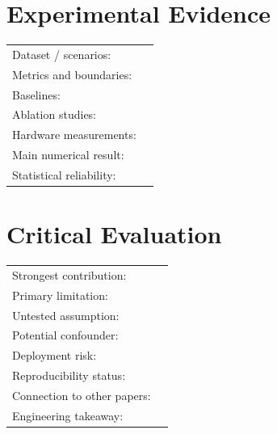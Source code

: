 \section*{Experimental Evidence}

\begin{tabularx}{\textwidth}{@{}p{4.0cm}X@{}}
Dataset / scenarios: & \\
Metrics and boundaries: & \\
Baselines: & \\
Ablation studies: & \\
Hardware measurements: & \\
Main numerical result: & \\
Statistical reliability: & \\
\end{tabularx}

\section*{Critical Evaluation}

\begin{tabularx}{\textwidth}{@{}p{4.0cm}X@{}}
Strongest contribution: & \\
Primary limitation: & \\
Untested assumption: & \\
Potential confounder: & \\
Deployment risk: & \\
Reproducibility status: & \\
Connection to other papers: & \\
Engineering takeaway: & \\
\end{tabularx}
